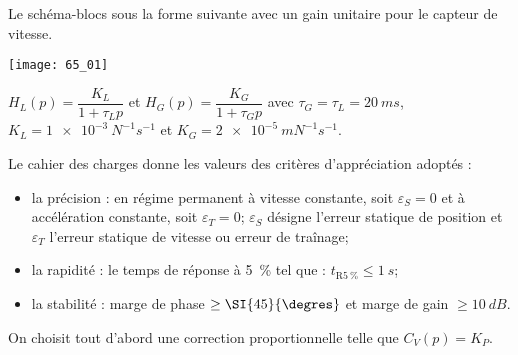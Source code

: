 \normaltrue \difficilefalse \tdifficilefalse
\correctionfalse

\setcounter{question}{0}


\ifcorrection
\else
{}
\fi

\ifprof
\else 

Le schéma-blocs sous la forme suivante avec un gain unitaire pour le capteur
de vitesse.

\begin{center}
\texttt{[image: 65\_01]}
\end{center}

$H_L(p)=\dfrac{K_L}{1+\tau_L p}$ et $H_G(p)=\dfrac{K_G}{1+\tau_G p}$  avec $\tau_G=\tau_L = \SI{20}{ms}$, $K_L = \SI{1e-3}{N^{-1}s^{-1}}$ et $K_G = \SI{2e-5}{mN^{-1}s^{-1}}$.


Le cahier des charges donne les valeurs des critères d'appréciation adoptés :
\begin{itemize}
\item la précision : en régime permanent à vitesse constante, soit $\varepsilon_S=0$ et à accélération constante, soit $\varepsilon_T=0$; $\varepsilon_S$ désigne l'erreur statique de position et $\varepsilon_T$ l'erreur statique de vitesse ou erreur de traînage;
\item la rapidité : le temps de réponse à \SI{5}{\%} tel que : $t_{\text{R}\SI{5}{\%}}\leq \SI{1}{s}$;
\item la stabilité : marge de phase $\geq \SI{45}{\degres}$ et marge de gain $\geq \SI{10}{dB}$.
\end{itemize}

On choisit tout d'abord une correction proportionnelle telle que $C_V(p)=K_P$.
\fi

\ifprof
\else 
\fi

\ifprof
\else 
\fi

\ifprof
\else 
\fi


